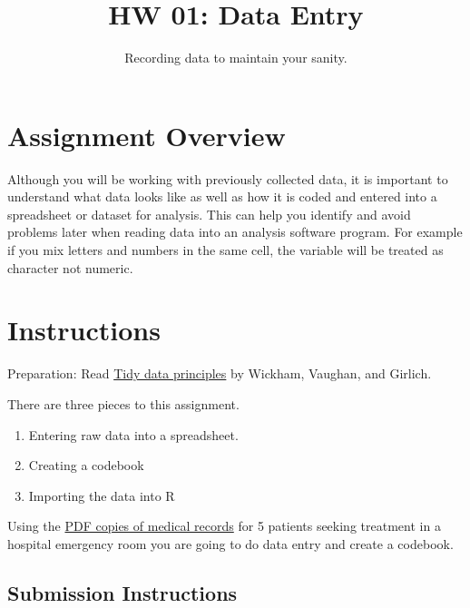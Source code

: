 \documentclass[
  letterpaper,
  DIV=11,
  numbers=noendperiod]{scrartcl}
\title{HW 01: Data Entry}
\subtitle{Recording data to maintain your sanity.}
\author{}
\date{}
\providecommand{\tightlist}{%
  \setlength{\itemsep}{0pt}\setlength{\parskip}{0pt}}\usepackage{longtable,booktabs,array}
\begin{document}
\maketitle
\ifdefined\Shaded\renewenvironment{Shaded}{\begin{tcolorbox}[enhanced, borderline west={3pt}{0pt}{shadecolor}, sharp corners, interior hidden, boxrule=0pt, frame hidden, breakable]}{\end{tcolorbox}}\fi

\hypertarget{assignment-overview}{%
\section{Assignment Overview}\label{assignment-overview}}

Although you will be working with previously collected data, it is
important to understand what data looks like as well as how it is coded
and entered into a spreadsheet or dataset for analysis. This can help
you identify and avoid problems later when reading data into an analysis
software program. For example if you mix letters and numbers in the same
cell, the variable will be treated as character not numeric.

\hypertarget{instructions}{%
\section{Instructions}\label{instructions}}

Preparation: Read
\href{https://tidyr.tidyverse.org/articles/tidy-data.html\#tidying}{Tidy
data principles} by Wickham, Vaughan, and Girlich.

There are three pieces to this assignment.

\begin{enumerate}
\def\labelenumi{\arabic{enumi}.}
\tightlist
\item
  Entering raw data into a spreadsheet.
\item
  Creating a codebook
\item
  Importing the data into R
\end{enumerate}

Using the \href{hw/medical-records.pdf}{PDF copies of medical records}
for 5 patients seeking treatment in a hospital emergency room you are
going to do data entry and create a codebook.

\hypertarget{submission-instructions}{%
\subsection{Submission Instructions}\label{submission-instructions}}
\end{document}
